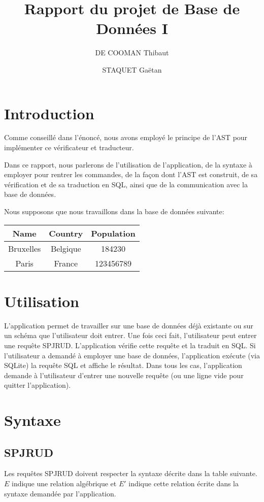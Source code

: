 \documentclass[]{article}
\title{Rapport du projet de Base de Donn\'ees I}
\author{DE COOMAN Thibaut \and STAQUET Ga\"etan}
\begin{document}
\maketitle

\tableofcontents

\section{Introduction}
Comme conseill\'e dans l'\'enonc\'e, nous avons employ\'e le principe de l'AST pour impl\'ementer ce v\'erificateur et traducteur.

Dans ce rapport, nous parlerons de l'utilisation de l'application, de la syntaxe \`a employer pour rentrer les commandes, de la fa\c{c}on dont l'AST est construit, de sa v\'erification et de sa traduction en SQL, ainsi que de la communication avec la base de donn\'ees.

Nous supposons que nous travaillons dans la base de donn\'ees suivante:

\begin{center}
	\begin{tabular}{| c | c | c |}
		\hline
		\textbf{Name} & \textbf{Country} & \textbf{Population} \\
		\hline
		Bruxelles & Belgique & 184230\\
		\hline
		Paris & France & 123456789\\
		\hline
	\end{tabular}
	\label{Cities}
\end{center}

\section{Utilisation}
L'application permet de travailler sur une base de donn\'ees d\'ej\`a existante ou sur un sch\'ema que l'utilisateur doit entrer. Une fois ceci fait, l'utilisateur peut entrer une requ\^ete SPJRUD. L'application v\'erifie cette requ\^ete et la traduit en SQL. Si l'utilisateur a demand\'e \`a employer une base de donn\'ees, l'application ex\'ecute (via SQLite) la requ\^ete SQL et affiche le r\'esultat. Dans tous les cas, l'application demande \`a l'utilisateur d'entrer une nouvelle requ\^ete (ou une ligne vide pour quitter l'application).

\section{Syntaxe}
\subsection{SPJRUD}
Les requ\^etes SPJRUD doivent respecter la syntaxe d\'ecrite dans la table suivante. $E$ indique une relation alg\'ebrique et $E'$ indique cette relation \'ecrite dans la syntaxe demand\'ee par l'application.
\end{document}
